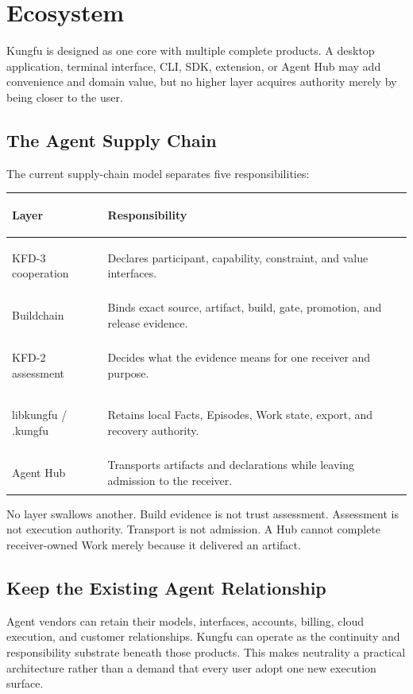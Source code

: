 \section{Ecosystem}

Kungfu is designed as one core with multiple complete products. A desktop
application, terminal interface, CLI, SDK, extension, or Agent Hub may add
convenience and domain value, but no higher layer acquires authority merely by
being closer to the user.

\subsection{The Agent Supply Chain}

The current supply-chain model separates five responsibilities:

\begin{center}
\small
\begin{tabularx}{\textwidth}{>{\bfseries\raggedright\arraybackslash}p{}>{\raggedright\arraybackslash}X}
\toprule
\textbf{Layer} & \textbf{Responsibility} \\
\midrule
KFD-3 cooperation & Declares participant, capability, constraint, and value interfaces. \\
Buildchain & Binds exact source, artifact, build, gate, promotion, and release evidence. \\
KFD-2 assessment & Decides what the evidence means for one receiver and purpose. \\
libkungfu / .kungfu & Retains local Facts, Episodes, Work state, export, and recovery authority. \\
Agent Hub & Transports artifacts and declarations while leaving admission to the receiver. \\
\bottomrule
\end{tabularx}
\end{center}

No layer swallows another. Build evidence is not trust assessment. Assessment
is not execution authority. Transport is not admission. A Hub cannot complete
receiver-owned Work merely because it delivered an artifact.

\subsection{Keep the Existing Agent Relationship}

Agent vendors can retain their models, interfaces, accounts, billing, cloud
execution, and customer relationships. Kungfu can operate as the continuity
and responsibility substrate beneath those products. This makes neutrality a
practical architecture rather than a demand that every user adopt one new
execution surface.

